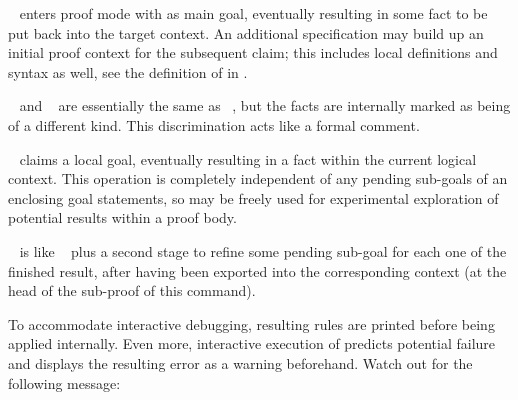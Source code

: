 \begin{isabellebody}
\begin{isamarkuptext}
  \begin{descr}
  
  \item [\mbox{\isa{\isacommand{lemma}}}~\isa{{\isachardoublequote}a{\isacharcolon}\ {\isasymphi}{\isachardoublequote}}] enters proof mode with
  \isa{{\isasymphi}} as main goal, eventually resulting in some fact \isa{{\isachardoublequote}{\isasymturnstile}\ {\isasymphi}{\isachardoublequote}} to be put back into the target context.  An additional
   specification may build up an initial proof
  context for the subsequent claim; this includes local definitions
  and syntax as well, see the definition of \mbox{} in
  .
  
  \item [\mbox{\isa{\isacommand{theorem}}}~\isa{{\isachardoublequote}a{\isacharcolon}\ {\isasymphi}{\isachardoublequote}} and \mbox{\isa{\isacommand{corollary}}}~\isa{{\isachardoublequote}a{\isacharcolon}\ {\isasymphi}{\isachardoublequote}}] are essentially the same as \mbox{}~, but the facts are internally marked as
  being of a different kind.  This discrimination acts like a formal
  comment.
  
  \item [\mbox{\isa{\isacommand{have}}}~\isa{{\isachardoublequote}a{\isacharcolon}\ {\isasymphi}{\isachardoublequote}}] claims a local goal,
  eventually resulting in a fact within the current logical context.
  This operation is completely independent of any pending sub-goals of
  an enclosing goal statements, so \mbox{} may be freely
  used for experimental exploration of potential results within a
  proof body.
  
  \item [\mbox{\isa{\isacommand{show}}}~\isa{{\isachardoublequote}a{\isacharcolon}\ {\isasymphi}{\isachardoublequote}}] is like \mbox{}~ plus a second stage to refine some pending
  sub-goal for each one of the finished result, after having been
  exported into the corresponding context (at the head of the
  sub-proof of this \mbox{} command).
  
  To accommodate interactive debugging, resulting rules are printed
  before being applied internally.  Even more, interactive execution
  of \mbox{} predicts potential failure and displays the
  resulting error as a warning beforehand.  Watch out for the
  following message:


\end{descr}
\end{isamarkuptext}
\end{isabellebody}
